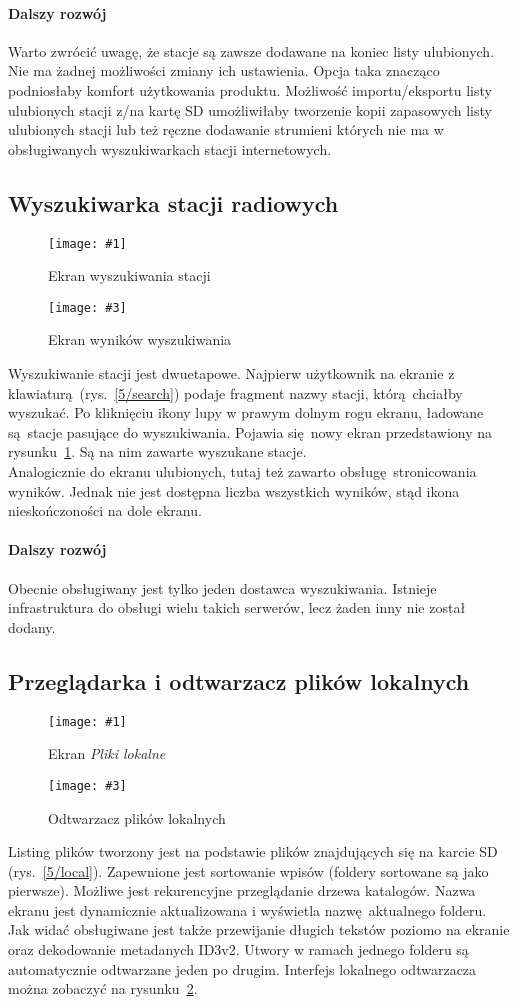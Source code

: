 \documentclass[polish]{aghengthesis}
\newcommand{\imgintss}[5]{
	\begin{figure}[{#5}]
		\centering
		\begin{minipage}{.45\textwidth}
			\centering
			\texttt{[image: \#1]}
			\caption{#2}
			\label{#1}
		\end{minipage}%
		\hfill
		\begin{minipage}{.45\textwidth}
			\centering
			\texttt{[image: \#3]}
			\caption{#4}
			\label{#3}
		\end{minipage}
	\end{figure}
}
\newcommand{\imghss}[4]{\imgintss{#1}{#2}{#3}{#4}{H}}
\begin{document}
			\paragraph{Dalszy rozwój}
				Warto zwrócić uwagę, że stacje są zawsze dodawane na koniec listy ulubionych. Nie ma żadnej możliwości zmiany ich ustawienia. Opcja taka znacząco podniosłaby komfort użytkowania produktu. Możliwość importu/eksportu listy ulubionych stacji z/na kartę SD umożliwiłaby tworzenie kopii zapasowych listy ulubionych stacji lub też ręczne dodawanie strumieni których nie ma w obsługiwanych wyszukiwarkach stacji internetowych.
			
		\subsection{Wyszukiwarka stacji radiowych}
			\imghss{5/search}{Ekran wyszukiwania stacji}{5/searchres}{Ekran wyników wyszukiwania}
			Wyszukiwanie stacji jest dwuetapowe. Najpierw użytkownik na ekranie z klawiaturą (rys.~\ref{5/search}) podaje fragment nazwy stacji, którą chciałby wyszukać. Po kliknięciu ikony lupy w prawym dolnym rogu ekranu, ładowane są stacje pasujące do wyszukiwania. Pojawia się nowy ekran przedstawiony na rysunku~\ref{5/searchres}. Są na nim zawarte wyszukane stacje.
			$ $\\
			
			Analogicznie do ekranu ulubionych, tutaj też zawarto obsługę stronicowania wyników. Jednak nie jest dostępna liczba wszystkich wyników, stąd ikona nieskończoności na dole ekranu.
			
			\paragraph{Dalszy rozwój}
				Obecnie obsługiwany jest tylko jeden dostawca wyszukiwania. Istnieje infrastruktura do obsługi wielu takich serwerów, lecz żaden inny nie został dodany.
			
		\subsection{Przeglądarka i odtwarzacz plików lokalnych}
			\imghss{5/local}{Ekran \textit{Pliki lokalne}}{5/local_play}{Odtwarzacz plików lokalnych}
			Listing plików tworzony jest na podstawie plików znajdujących się na karcie SD (rys.~\ref{5/local}). Zapewnione jest sortowanie wpisów (foldery sortowane są jako pierwsze). Możliwe jest rekurencyjne przeglądanie drzewa katalogów. Nazwa ekranu jest dynamicznie aktualizowana i wyświetla nazwę aktualnego folderu. Jak widać obsługiwane jest także przewijanie długich tekstów poziomo na ekranie oraz dekodowanie metadanych ID3v2. Utwory w ramach jednego folderu są automatycznie odtwarzane jeden po drugim. Interfejs lokalnego odtwarzacza można zobaczyć na rysunku~\ref{5/local_play}.
			
\end{document}
